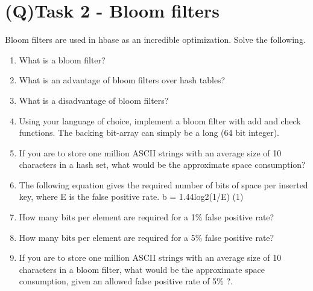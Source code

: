 \documentclass[a4paper,12pt]{article}
\begin{document}
\clearpage

\section{(Q)Task 2 - Bloom filters}
Bloom filters are used in hbase as an incredible optimization. Solve the following. \\
\begin{enumerate}
\item What is a bloom filter?
\item What is an advantage of bloom filters over hash tables?
\item What is a disadvantage of bloom filters?
\item Using your language of choice, implement a bloom filter with add and
check functions. The backing bit-array can simply be a long (64 bit
integer).
\item If you are to store one million ASCII strings with an average size of 10
characters in a hash set, what would be the approximate space consumption?
\item The following equation gives the required number of bits of space per
inserted key, where E is the false positive rate.
b = 1.44log2(1/E) (1)
\item How many bits per element are required for a 1\% false positive rate?
\item How many bits per element are required for a 5\% false positive rate?
\item If you are to store one million ASCII strings with an average size of 10
characters in a bloom filter, what would be the approximate space consumption, given an allowed false positive rate of 5\% ?.
\end{enumerate}
\end{document}
